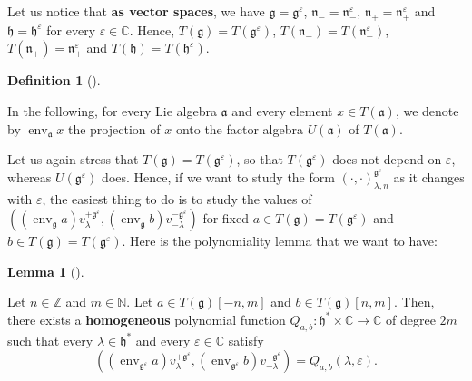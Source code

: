 \documentclass
[numbers=enddot,12pt,final,onecolumn,german,notitlepage]{scrartcl}%
\theoremstyle{definition}
\newtheorem{lem}[theo]{Lemma}
\newenvironment{lemma}[1][]
{\begin{lem}[#1]\begin{leftbar}}
{\end{leftbar}\end{lem}}
\newtheorem{defi}[theo]{Definition}
\newenvironment{definition}[1][]
{\begin{defi}[#1]\begin{leftbar}}
{\end{leftbar}\end{defi}}
\begin{document}
Let us notice that \textbf{as vector spaces}, we have $\mathfrak{g}%
=\mathfrak{g}^{\varepsilon}$, $\mathfrak{n}_{-}=\mathfrak{n}_{-}^{\varepsilon
}$, $\mathfrak{n}_{+}=\mathfrak{n}_{+}^{\varepsilon}$ and $\mathfrak{h}%
=\mathfrak{h}^{\varepsilon}$ for every $\varepsilon\in\mathbb{C}$. Hence,
$T\left(  \mathfrak{g}\right)  =T\left(  \mathfrak{g}^{\varepsilon}\right)  $,
$T\left(  \mathfrak{n}_{-}\right)  =T\left(  \mathfrak{n}_{-}^{\varepsilon
}\right)  $, $T\left(  \mathfrak{n}_{+}\right)  =\mathfrak{n}_{+}%
^{\varepsilon}$ and $T\left(  \mathfrak{h}\right)  =T\left(  \mathfrak{h}%
^{\varepsilon}\right)  $.

\begin{definition}
In the following, for every Lie algebra $\mathfrak{a}$ and every element $x\in
T\left(  \mathfrak{a}\right)  $, we denote by $\operatorname*{env}%
\nolimits_{\mathfrak{a}}x$ the projection of $x$ onto the factor algebra
$U\left(  \mathfrak{a}\right)  $ of $T\left(  \mathfrak{a}\right)  $.
\end{definition}

Let us again stress that $T\left(  \mathfrak{g}\right)  =T\left(
\mathfrak{g}^{\varepsilon}\right)  $, so that $T\left(  \mathfrak{g}%
^{\varepsilon}\right)  $ does not depend on $\varepsilon$, whereas $U\left(
\mathfrak{g}^{\varepsilon}\right)  $ does. Hence, if we want to study the form
$\left(  \cdot,\cdot\right)  _{\lambda,n}^{\mathfrak{g}^{\varepsilon}}$ as it
changes with $\varepsilon$, the easiest thing to do is to study the values of
$\left(  \left(  \operatorname*{env}\nolimits_{\mathfrak{g}}a\right)
v_{\lambda}^{+\mathfrak{g}^{\varepsilon}},\left(  \operatorname*{env}%
\nolimits_{\mathfrak{g}}b\right)  v_{-\lambda}^{-\mathfrak{g}^{\varepsilon}%
}\right)  $ for fixed $a\in T\left(  \mathfrak{g}\right)  =T\left(
\mathfrak{g}^{\varepsilon}\right)  $ and $b\in T\left(  \mathfrak{g}\right)
=T\left(  \mathfrak{g}^{\varepsilon}\right)  $. Here is the polynomiality
lemma that we want to have:

\begin{lemma}
\label{lem.invformnondeg.polynomiality}Let $n\in\mathbb{Z}$ and $m\in
\mathbb{N}$. Let $a\in T\left(  \mathfrak{g}\right)  \left[  -n,m\right]  $
and $b\in T\left(  \mathfrak{g}\right)  \left[  n,m\right]  $. Then, there
exists a \textbf{homogeneous} polynomial function $Q_{a,b}:\mathfrak{h}^{\ast
}\times\mathbb{C}\rightarrow\mathbb{C}$ of degree $2m$ such that every
$\lambda\in\mathfrak{h}^{\ast}$ and every $\varepsilon\in\mathbb{C}$ satisfy%
\[
\left(  \left(  \operatorname*{env}\nolimits_{\mathfrak{g}^{\varepsilon}%
}a\right)  v_{\lambda}^{+\mathfrak{g}^{\varepsilon}},\left(
\operatorname*{env}\nolimits_{\mathfrak{g}^{\varepsilon}}b\right)
v_{-\lambda}^{-\mathfrak{g}^{\varepsilon}}\right)  =Q_{a,b}\left(
\lambda,\varepsilon\right)  .
\]

\end{lemma}
\end{document}
